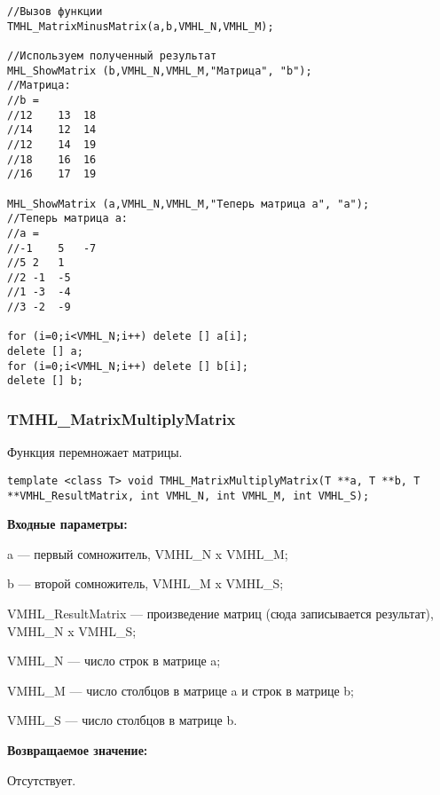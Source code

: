 \documentclass[a4paper,12pt]{article}
\begin{document}
\begin{lstlisting}[label=code_use_TMHL_MatrixMinusMatrix,caption=Пример использования]
//Вызов функции
TMHL_MatrixMinusMatrix(a,b,VMHL_N,VMHL_M);

//Используем полученный результат
MHL_ShowMatrix (b,VMHL_N,VMHL_M,"Матрица", "b");
//Матрица:
//b =
//12	13	18
//14	12	14
//12	14	19
//18	16	16
//16	17	19

MHL_ShowMatrix (a,VMHL_N,VMHL_M,"Теперь матрица a", "a");
//Теперь матрица a:
//a =
//-1	5	-7
//5	2	1
//2	-1	-5
//1	-3	-4
//3	-2	-9

for (i=0;i<VMHL_N;i++) delete [] a[i];
delete [] a;
for (i=0;i<VMHL_N;i++) delete [] b[i];
delete [] b;
\end{lstlisting}

\subsubsection{TMHL\_MatrixMultiplyMatrix}\label{TMHL_MatrixMultiplyMatrix}

Функция перемножает матрицы.


\begin{lstlisting}[label=code_syntax_TMHL_MatrixMultiplyMatrix,caption=Синтаксис]
template <class T> void TMHL_MatrixMultiplyMatrix(T **a, T **b, T **VMHL_ResultMatrix, int VMHL_N, int VMHL_M, int VMHL_S);
\end{lstlisting}

\textbf{Входные параметры:}

a --- первый сомножитель, VMHL\_N x VMHL\_M;
 
b --- второй сомножитель, VMHL\_M x VMHL\_S;
 
VMHL\_ResultMatrix --- произведение матриц (сюда записывается результат), VMHL\_N x VMHL\_S;
 
VMHL\_N --- число строк в матрице a;
 
VMHL\_M --- число столбцов в матрице a и строк в матрице b;
 
VMHL\_S --- число столбцов в матрице b.

\textbf{Возвращаемое значение:}

Отсутствует.
\end{document}
